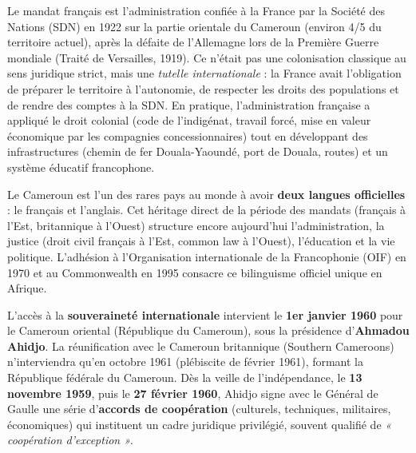 \documentclass[11pt]{article}
\newcommand{\cle}[1]{{\popxbold\color{popdark}#1}}
\begin{document}
\begin{definition}
Le \cle{mandat français} est l'administration confiée à la France par la \cle{Société des Nations (SDN)} en 1922 sur la partie orientale du Cameroun (environ 4/5 du territoire actuel), après la défaite de l'Allemagne lors de la Première Guerre mondiale (Traité de Versailles, 1919). Ce n'était pas une colonisation classique au sens juridique strict, mais une \emph{tutelle internationale} : la France avait l'obligation de préparer le territoire à l'autonomie, de respecter les droits des populations et de rendre des comptes à la SDN. En pratique, l'administration française a appliqué le droit colonial (code de l'indigénat, travail forcé, mise en valeur économique par les compagnies concessionnaires) tout en développant des infrastructures (chemin de fer Douala-Yaoundé, port de Douala, routes) et un système éducatif francophone.
\end{definition}

\begin{savaistu}
Le Cameroun est l'un des rares pays au monde à avoir \textbf{deux langues officielles} : le français et l'anglais. Cet héritage direct de la période des mandats (français à l'Est, britannique à l'Ouest) structure encore aujourd'hui l'administration, la justice (droit civil français à l'Est, common law à l'Ouest), l'éducation et la vie politique. L'adhésion à l'Organisation internationale de la Francophonie (OIF) en 1970 et au Commonwealth en 1995 consacre ce bilinguisme officiel unique en Afrique.
\end{savaistu}

L'accès à la \textbf{souveraineté internationale} intervient le \textbf{1er janvier 1960} pour le Cameroun oriental (République du Cameroun), sous la présidence d'\textbf{Ahmadou Ahidjo}. La réunification avec le Cameroun britannique (Southern Cameroons) n'interviendra qu'en octobre 1961 (plébiscite de février 1961), formant la République fédérale du Cameroun. Dès la veille de l'indépendance, le \textbf{13 novembre 1959}, puis le \textbf{27 février 1960}, Ahidjo signe avec le Général de Gaulle une série d'\textbf{accords de coopération} (culturels, techniques, militaires, économiques) qui instituent un cadre juridique privilégié, souvent qualifié de \emph{« coopération d'exception »}.
\end{document}
